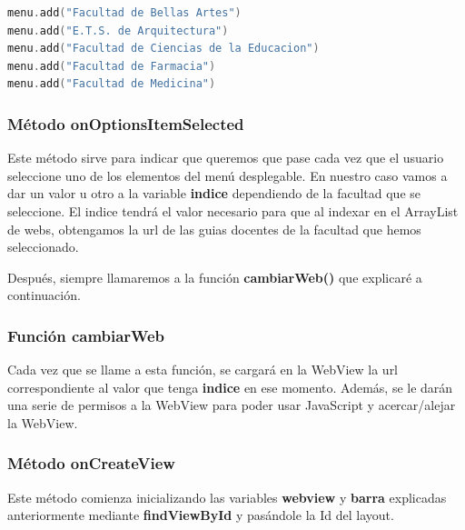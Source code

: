 \documentclass[a4paper,11pt]{article}
\begin{document}
\vspace{5 mm}

\begin{lstlisting}[language=Kotlin]
menu.add("Facultad de Bellas Artes")
menu.add("E.T.S. de Arquitectura")
menu.add("Facultad de Ciencias de la Educacion")
menu.add("Facultad de Farmacia")
menu.add("Facultad de Medicina")
\end{lstlisting}

\newpage

\subsubsection{Método onOptionsItemSelected}

\vspace{5 mm}

Este método sirve para indicar que queremos que pase cada vez que el usuario seleccione uno de los elementos del menú desplegable. En nuestro caso vamos a dar un valor u otro a la variable \textbf{indice} dependiendo de la facultad que se seleccione. El indice tendrá el valor necesario para que al indexar en el ArrayList de webs, obtengamos la url de las guias docentes de la facultad que hemos seleccionado.

\vspace{5 mm}

Después, siempre llamaremos a la función \textbf{cambiarWeb()} que explicaré a continuación.

\vspace{5 mm}

\subsubsection{Función cambiarWeb}

\vspace{5 mm}

Cada vez que se llame a esta función, se cargará en la WebView la url correspondiente al valor que tenga \textbf{indice} en ese momento.
Además, se le darán una serie de permisos a la WebView para poder usar JavaScript y acercar/alejar la WebView.

\subsubsection{Método onCreateView}

\vspace{5 mm}

Este método comienza inicializando las variables \textbf{webview} y \textbf{barra} explicadas anteriormente mediante \textbf{findViewById} y pasándole la Id del layout.
\end{document}
